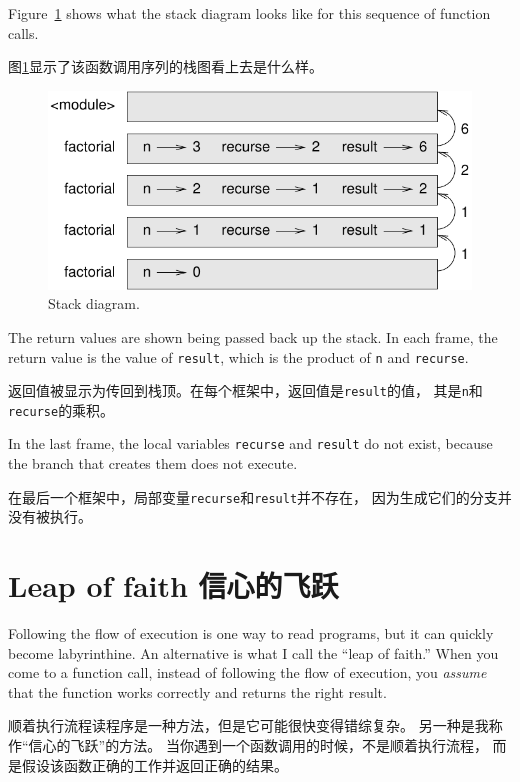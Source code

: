 \documentclass[10pt]{book}
\begin{document}
\begin{CJK}{UTF8}{gbsn}
Figure~\ref{fig.stack3} shows what the stack diagram looks like for
this sequence of function calls.

图\ref{fig.stack3}显示了该函数调用序列的栈图看上去是什么样。

\begin{figure}
\centerline
{\includegraphics[scale=0.8]{figs/stack3.pdf}}
\caption{Stack diagram.}
\label{fig.stack3}
\end{figure}

The return values are shown being passed back up the stack.  In each
frame, the return value is the value of {\tt result}, which is the
product of {\tt n} and {\tt recurse}.

返回值被显示为传回到栈顶。在每个框架中，返回值是{\tt result}的值，
其是{\tt n}和{\tt recurse}的乘积。

In the last frame, the local
variables {\tt recurse} and {\tt result} do not exist, because
the branch that creates them does not execute.

在最后一个框架中，局部变量{\tt recurse}和{\tt result}并不存在，
因为生成它们的分支并没有被执行。


\section{Leap of faith 信心的飞跃}

Following the flow of execution is one way to read programs, but
it can quickly become labyrinthine.  An
alternative is what I call the ``leap of faith.''  When you come to a
function call, instead of following the flow of execution, you {\em
assume} that the function works correctly and returns the right
result.

顺着执行流程读程序是一种方法，但是它可能很快变得错综复杂。
另一种是我称作``信心的飞跃''的方法。
当你遇到一个函数调用的时候，不是顺着执行流程，
而是假设该函数正确的工作并返回正确的结果。


\end{CJK}
\end{document}
